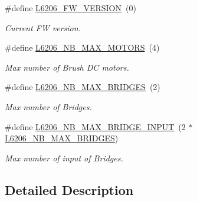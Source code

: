 \begin{DoxyCompactItemize}
\item 
\mbox{\label{group___l6206___exported___constants_ga43407b8737dcb15bd27496e58af171bf}} 
\#define \mbox{\hyperlink{group___l6206___exported___constants_ga43407b8737dcb15bd27496e58af171bf}{L6206\+\_\+\+F\+W\+\_\+\+V\+E\+R\+S\+I\+ON}}~(0)
\begin{DoxyCompactList}\small\item\em Current FW version. \end{DoxyCompactList}\item 
\mbox{\label{group___l6206___exported___constants_ga64b1ce7748d44eb6f6973dfe8c7fd196}} 
\#define \mbox{\hyperlink{group___l6206___exported___constants_ga64b1ce7748d44eb6f6973dfe8c7fd196}{L6206\+\_\+\+N\+B\+\_\+\+M\+A\+X\+\_\+\+M\+O\+T\+O\+RS}}~(4)
\begin{DoxyCompactList}\small\item\em Max number of Brush DC motors. \end{DoxyCompactList}\item 
\mbox{\label{group___l6206___exported___constants_gae72db6f074defd956d309151334f448d}} 
\#define \mbox{\hyperlink{group___l6206___exported___constants_gae72db6f074defd956d309151334f448d}{L6206\+\_\+\+N\+B\+\_\+\+M\+A\+X\+\_\+\+B\+R\+I\+D\+G\+ES}}~(2)
\begin{DoxyCompactList}\small\item\em Max number of Bridges. \end{DoxyCompactList}\item 
\mbox{\label{group___l6206___exported___constants_ga672b88d2cc08d7e4216e226f966c862b}} 
\#define \mbox{\hyperlink{group___l6206___exported___constants_ga672b88d2cc08d7e4216e226f966c862b}{L6206\+\_\+\+N\+B\+\_\+\+M\+A\+X\+\_\+\+B\+R\+I\+D\+G\+E\+\_\+\+I\+N\+P\+UT}}~(2 $\ast$ \mbox{\hyperlink{group___l6206___exported___constants_gae72db6f074defd956d309151334f448d}{L6206\+\_\+\+N\+B\+\_\+\+M\+A\+X\+\_\+\+B\+R\+I\+D\+G\+ES}})
\begin{DoxyCompactList}\small\item\em Max number of input of Bridges. \end{DoxyCompactList}\end{DoxyCompactItemize}


\subsection{Detailed Description}
